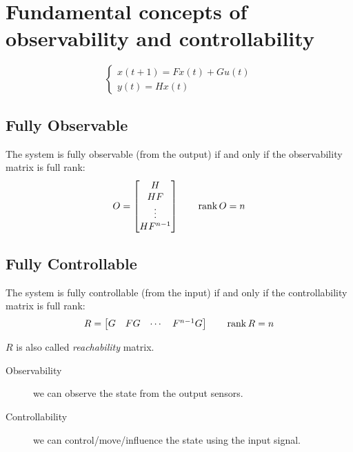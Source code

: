 \newpage
{}

\section{Fundamental concepts of observability and controllability}

\[
    \begin{cases}
        x(t+1) = Fx(t) + Gu(t) \\
        y(t) = Hx(t)
    \end{cases}
\]

\subsection{Fully Observable}
The system is fully observable (from the output) if and only if the observability matrix is full rank:
\[
    O = \begin{bmatrix}
        H \\
        HF \\
        \vdots \\
        HF^{n-1}
    \end{bmatrix}
    \qquad
    \operatorname{rank} O = n
\]

\subsection{Fully Controllable}
The system is fully controllable (from the input) if and only if the controllability matrix is full rank:
\[
    R = \begin{bmatrix}
        G & FG & \cdots & F^{n-1}G
    \end{bmatrix}
    \qquad
    \operatorname{rank} R = n
\]

$R$ is also called \emph{reachability} matrix.

\begin{remark}
    \begin{description}
        \item[Observability] we can observe the state from the output sensors.
        \item[Controllability] we can control/move/influence the state using the input signal.
    \end{description}
\end{remark}


